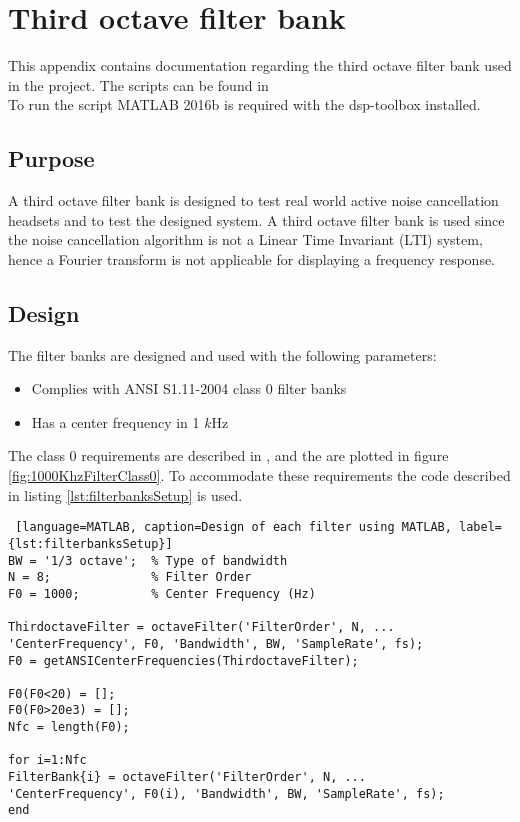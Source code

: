 \section{Third octave filter bank} {\label{sec:OctaveBank}}


This appendix contains documentation regarding the third octave filter bank used in the project. The scripts can be found in 
\\
To run the script MATLAB 2016b is required with the dsp-toolbox installed. 

\subsection{Purpose}

A third octave filter bank is designed to test real world active noise cancellation headsets and to test the designed system. A third octave filter bank is used since the noise cancellation algorithm is not a Linear Time Invariant (LTI) system, hence a Fourier transform is not applicable for displaying a frequency response.

\subsection{Design}

The filter banks are designed and used with the following parameters:
\begin{itemize}
	\item Complies with ANSI S1.11-2004 class 0 filter banks
	\item Has a center frequency in 1 $k$Hz
\end{itemize}
The class 0 requirements are described in \cite{OctaveBand}, and the are plotted in figure \ref{fig:1000KhzFilterClass0}. To accommodate these requirements the code described in listing \ref{lst:filterbanksSetup} is used.

\begin{lstlisting} [language=MATLAB, caption=Design of each filter using MATLAB, label={lst:filterbanksSetup}]
BW = '1/3 octave';	% Type of bandwidth
N = 8;           	% Filter Order
F0 = 1000;       	% Center Frequency (Hz)

ThirdoctaveFilter = octaveFilter('FilterOrder', N, ...
'CenterFrequency', F0, 'Bandwidth', BW, 'SampleRate', fs);
F0 = getANSICenterFrequencies(ThirdoctaveFilter);

F0(F0<20) = [];
F0(F0>20e3) = [];
Nfc = length(F0);

for i=1:Nfc
FilterBank{i} = octaveFilter('FilterOrder', N, ...
'CenterFrequency', F0(i), 'Bandwidth', BW, 'SampleRate', fs); 
end
\end{lstlisting}

